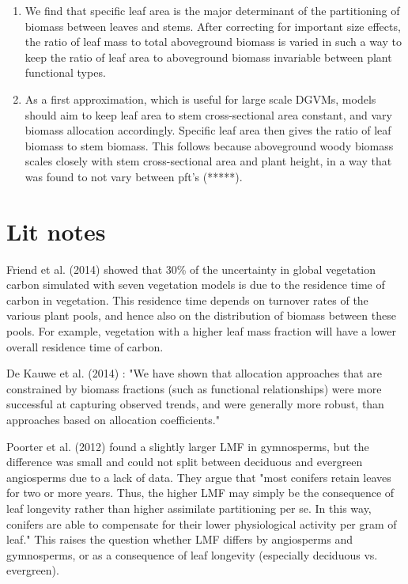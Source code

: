 \documentclass[a4paper]{article}
\begin{document}
\begin{enumerate}
  \item We find that specific leaf area is the major determinant of the partitioning of biomass between leaves and stems. After correcting for important size effects, the ratio of leaf mass to total aboveground biomass is varied in such a way to keep the ratio of leaf area to aboveground biomass invariable between plant functional types.
  \item As a first approximation, which is useful for large scale DGVMs, models should aim to keep leaf area to stem cross-sectional area constant, and vary biomass allocation accordingly. Specific leaf area then gives the ratio of leaf biomass to stem biomass. This follows because aboveground woody biomass scales closely with stem cross-sectional area and plant height, in a way that was found to not vary between pft's (*****). 


\end{enumerate}






\section{Lit notes}

Friend et al. (2014) showed that 30\% of the uncertainty in global vegetation carbon simulated with seven vegetation models is due to the residence time of carbon in vegetation. This residence time depends on turnover rates of the various plant pools, and hence also on the distribution of biomass between these pools. For example, vegetation with a higher leaf mass fraction will have a lower overall residence time of carbon.

De Kauwe et al. (2014) : "We have shown that allocation approaches that are constrained by biomass fractions (such as functional relationships) were more successful at capturing observed trends, and were generally more robust, than approaches based on allocation coefficients."

Poorter et al. (2012) found a slightly larger LMF in gymnosperms, but the difference was small and could not split between deciduous and evergreen angiosperms due to a lack of data. They argue that "most conifers retain leaves for two or more years. Thus, the higher LMF may simply be the consequence of leaf longevity rather than higher assimilate partitioning per se. In this way, conifers are able to compensate for their lower physiological activity per gram of leaf." This raises the question whether LMF differs by angiosperms and gymnosperms, or as a consequence of leaf longevity (especially deciduous vs. evergreen).
\end{document}
